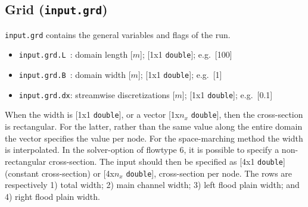 \documentclass[a4paper, 11pt]{article}
\begin{document}
%
%
\subsection{Grid (\texttt{input.grd})}
\label{subsubsec:in_grd}
%
\texttt{input.grd} contains the general variables and flags of the run.
\begin{itemize}
\item \texttt{input.grd.L }: domain length [$m$]; [1x1 \texttt{double}]; e.g.\ [100]
\item \texttt{input.grd.B }: domain width [$m$]; [1x1 \texttt{double}]; e.g.\ [1]
\item \texttt{input.grd.dx}: streamwise discretizations [$m$]; [1x1 \texttt{double}]; e.g.\ [0.1]
\end{itemize}
%
When the width is [1x1 \texttt{double}], or  a vector [1x$n_x$ \texttt{double}], then the cross-section is rectangular. For the latter, rather than the same value along the entire domain the vector specifies the value per node. For the space-marching method the width is interpolated.  In the solver-option of flowtype 6, it is possible to specify a non-rectangular cross-section. The input should then be specified as [4x1 \texttt{double}] (constant cross-section) or   [4x$n_x$ \texttt{double}], cross-section per node. The rows are respectively 1) total width; 2) main channel width; 3) left flood plain width; and 4) right flood plain width.
\end{document}
